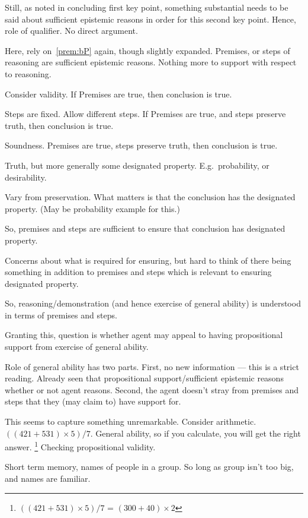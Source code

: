 \begin{note}
  Still, as noted in concluding first key point, something substantial needs to be said about sufficient epistemic reasons in order for this second key point.
  Hence, role of qualifier.
  No direct argument.

  Here, rely on~\ref{prem:bP} again, though slightly expanded.
  Premises, or steps of reasoning are sufficient epistemic reasons.
  Nothing more to support with respect to reasoning.

  Consider validity.
  If Premises are true, then conclusion is true.

  Steps are fixed.
  Allow different steps.
  If Premises are true, and steps preserve truth, then conclusion is true.

  Soundness.
  Premises are true, steps preserve truth, then conclusion is true.

  Truth, but more generally some designated property.
  E.g.\ probability, or desirability.

  Vary from preservation.
  What matters is that the conclusion has the designated property.
  (May be probability example for this.)

  So, premises and steps are sufficient to ensure that conclusion has designated property.

  Concerns about what is required for ensuring, but hard to think of there being something in addition to premises and steps which is relevant to ensuring designated property.

  So, reasoning/demonstration (and hence exercise of general ability) is understood in terms of premises and steps.

  Granting this, question is whether agent may appeal to having propositional support from exercise of general ability.

  Role of general ability has two parts.
  First, no new information --- this is a strict reading.
  Already seen that propositional support/sufficient epistemic reasons whether or not agent reasons.
  Second, the agent doesn't stray from premises and steps that they (may claim to) have support for.

  This seems to capture something unremarkable.
  Consider arithmetic.
  \(((421 + 531) \times 5)/7\).
  General ability, so if you calculate, you will get the right answer.\nolinebreak
  \footnote{
    \(((421 + 531) \times 5)/7\) = \((300 + 40) \times 2\)
  }
  Checking propositional validity.

  Short term memory, names of people in a group.
  So long as group isn't too big, and names are familiar.


\end{note}
